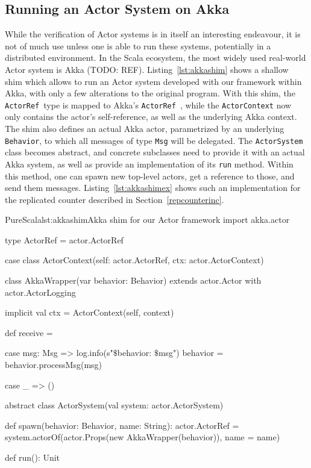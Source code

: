 \documentclass[a4paper,twoside]{article}
\newcommand{\InlineS}[1]{\lstinline[language=PureScala,basicstyle=\small\ttfamily,columns=fixed]|#1|}
\newcommand{\TODO}[1]{\textcolor{YellowOrange}{(TODO: #1)}} %
\newcommand{\RefSec}[1]{Section~\ref{#1}}
\newcommand{\RefCode}[1]{Listing~\ref{#1}}
\newcommand{\ActorRef}{\InlineS{ActorRef}\ }
\newcommand{\stt}[1]{\texttt{\small{#1}}}
\begin{document}
\subsection{Running an Actor System on Akka}
\label{akka}

While the verification of Actor systems is in itself an interesting endeavour, it is not of much use unless one is able to run these systems, potentially in a distributed environment. In the Scala ecosystem, the most widely used real-world Actor system is Akka \TODO{REF}. \RefCode{lst:akkashim} shows a shallow shim which allows to run an Actor system developed with our framework within Akka, with only a few alterations to the original program. With this shim, the \ActorRef type is mapped to Akka's \ActorRef, while the \stt{ActorContext} now only contains the actor's self-reference, as well as the underlying Akka context. The shim also defines an actual Akka actor, parametrized by an underlying \stt{Behavior}, to which all messages of type \stt{Msg} will be delegated. The \stt{ActorSystem} class becomes abstract, and concrete subclasses need to provide it with an actual Akka system, as well as provide an implementation of its \stt{run} method. Within this method, one can spawn new top-level actors, get a reference to those, and send them messages. \RefCode{lst:akkashimex} shows such an implementation for the replicated counter described in \RefSec{repcounterinc}.

\begin{Code}{PureScala}{lst:akkashim}{Akka shim for our Actor framework}
import akka.actor

type ActorRef = actor.ActorRef

case class ActorContext(self: actor.ActorRef, ctx: actor.ActorContext)

class AkkaWrapper(var behavior: Behavior)
  extends actor.Actor with actor.ActorLogging {

  implicit val ctx = ActorContext(self, context)

  def receive = {
    case msg: Msg =>
      log.info(s"$\$${behavior}: $\$${msg}")
      behavior = behavior.processMsg(msg)

    case _ => ()
  }
}

abstract class ActorSystem(val system: actor.ActorSystem) {
  def spawn(behavior: Behavior, name: String): actor.ActorRef = {
    system.actorOf(actor.Props(new AkkaWrapper(behavior)), name = name)
  }

  def run(): Unit
}
\end{Code}
\end{document}
